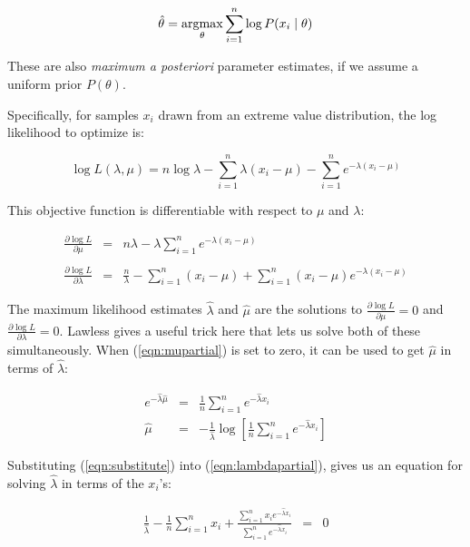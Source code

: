 \[
   \hat{\theta} = \mathop{\mathrm{argmax}}\limits_{\theta} \sum_{i=1}^{n} \log P(x_i \mid \theta)
\]

These are also \emph{maximum a posteriori} parameter estimates, if we
assume a uniform prior $P(\theta)$.

Specifically, for samples $x_i$ drawn from an extreme value
distribution, the log likelihood to optimize is:

\begin{equation}
\log L(\lambda, \mu) = n \log \lambda - \sum_{i=1}^{n} \lambda(x_i -
\mu) - \sum_{i=1}^{n} e^{-\lambda(x_i - \mu)}
\label{eqn:gev_logL}
\end{equation}

This objective function is differentiable with respect to $\mu$ and
$\lambda$:

\begin{eqnarray}
\frac{\partial \log L}{\partial \mu} & = &
n \lambda - \lambda \sum_{i=1}^{n} e^{-\lambda (x_i - \mu)}\\%
\\%
\label{eqn:mupartial}
\frac{\partial \log L}{\partial \lambda} & = &
\frac{n}{\lambda} - \sum_{i=1}^{n} (x_i - \mu) +  
\sum_{i=1}^{n} (x_i - \mu) e^{-\lambda (x_i - \mu)}
\label{eqn:lambdapartial}
\end{eqnarray}

The maximum likelihood estimates $\hat{\lambda}$ and $\hat{\mu}$ are
the solutions to $\frac{\partial \log L}{\partial \mu} = 0$ and
$\frac{\partial \log L}{\partial \lambda} = 0$. Lawless
\citep{Lawless82} gives a useful trick here that lets us solve both of
these simultaneously. When (\ref{eqn:mupartial}) is set to zero, it
can be used to get $\hat{\mu}$ in terms of $\hat{\lambda}$:

\begin{eqnarray}
e^{-\hat{\lambda} \hat{\mu}} & = & \frac{1}{n} \sum_{i=1}^{n} e^{-\hat{\lambda} x_i} 
\label{eqn:substitute}\\
\hat{\mu} & = & - \frac{1}{\hat{\lambda}} 
	\log \left[ \frac{1}{n} \sum_{i=1}^{n} e^{-\hat{\lambda} x_i} \right]
\label{eqn:solvemu}
\end{eqnarray}

Substituting (\ref{eqn:substitute}) into (\ref{eqn:lambdapartial}),
gives us an equation for solving $\hat{\lambda}$ in terms of the
$x_i$'s:

\begin{eqnarray}
\frac{1}{\hat{\lambda}} - \frac{1}{n} \sum_{i=1}^{n} x_i +
\frac{\sum_{i=1}^{n} x_i e^{-\hat{\lambda} x_i}}
     {\sum_{i=1}^{n} e^{-\hat{\lambda} x_i}} 
& = & 0
\label{eqn:newtontarget}
\end{eqnarray}

